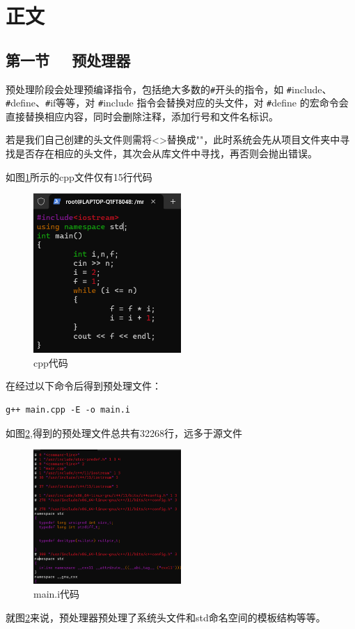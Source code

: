 \documentclass[UTF8,a4paper,10pt]{ctexart}
\begin{document}
\section{正文}



\subsection{第一节 \ \ 预处理器}
预处理阶段会处理预编译指令，包括绝大多数的\verb|#|开头的指令，如 \verb|#|include、\verb|#|define、\verb|#|if等等，对 \verb|#|include 指令会替换对应的头文件，对 \verb|#|define 的宏命令会直接替换相应内容，同时会删除注释，添加行号和文件名标识。


若是我们自己创建的头文件则需将<>替换成""，此时系统会先从项目文件夹中寻找是否存在相应的头文件，其次会从库文件中寻找，再否则会抛出错误。

如图\ref{fig:1}所示的cpp文件仅有15行代码
\begin{figure}[H]
    \centering
    \includegraphics[width=0.5\textwidth]{imgs/cppcode.png}
    \caption{cpp代码}
    \label{fig:1}
\end{figure}

在经过以下命令后得到预处理文件：
\begin{lstlisting}[frame=trbl]
  g++ main.cpp -E -o main.i
\end{lstlisting}\par

如图\ref{fig:2},得到的预处理文件总共有32268行，远多于源文件
\begin{figure}[H]
    \centering
    \includegraphics[width=0.5\textwidth,height=0.5\textwidth]{imgs/maini.png}
    \caption{main.i代码}
    \label{fig:2}
\end{figure}
就图\ref{fig:2}来说，预处理器预处理了系统头文件和std命名空间的模板结构等等。
\end{document}
